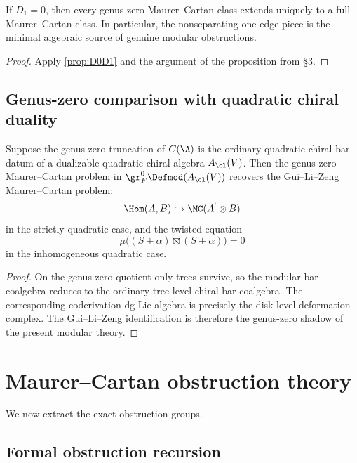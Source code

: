 \begin{corollary}
If $D_1=0$, then every genus-zero Maurer--Cartan class extends uniquely to a full
Maurer--Cartan class. In particular, the nonseparating one-edge piece is the minimal
algebraic source of genuine modular obstructions.
\end{corollary}

\begin{proof}
Apply \cref{prop:D0D1} and the argument of the proposition from \S3.
\end{proof}

\subsection{Genus-zero comparison with quadratic chiral duality}

\begin{proposition}
Suppose the genus-zero truncation of $C(\A)$ is the ordinary quadratic chiral bar datum
of a dualizable quadratic chiral algebra $A_{\cl}(V)$. Then the genus-zero Maurer--Cartan
problem in $\gr_F^0\Defmod(A_{\cl}(V))$ recovers the Gui--Li--Zeng Maurer--Cartan problem:
\[
\Hom(A,B)\hookrightarrow \MC(A^!\otimes B)
\]
in the strictly quadratic case, and the twisted equation
\[
\mu\big((S+\alpha)\boxtimes (S+\alpha)\big)=0
\]
in the inhomogeneous quadratic case.
\end{proposition}

\begin{proof}
On the genus-zero quotient only trees survive, so the modular bar coalgebra reduces to the
ordinary tree-level chiral bar coalgebra. The corresponding coderivation dg Lie algebra is
precisely the disk-level deformation complex. The Gui--Li--Zeng identification is therefore
the genus-zero shadow of the present modular theory.
\end{proof}

\section{Maurer--Cartan obstruction theory}

We now extract the exact obstruction groups.

\subsection{Formal obstruction recursion}

